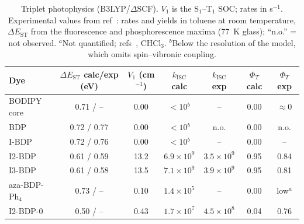 \documentclass[journal=jctcce,manuscript=article]{achemso}
\newcommand{\kisc}{k_\mathrm{ISC}}
\begin{document}
\begin{table}
  \caption{Triplet photophysics (B3LYP/$\Delta$SCF). $V_1$ is the S$_1$--T$_1$ SOC; rates in s$^{-1}$.
  Experimental values from ref~: rates and yields in toluene at room temperature,
  $\Delta E_\mathrm{ST}$ from the fluorescence and phosphorescence maxima (77~K glass); ``n.o.'' = not observed.
  $^a$Not quantified; refs~, CHCl$_3$. $^b$Below the resolution of the model, which
  omits spin--vibronic coupling.}
  \label{tab:isc}
  \small
  \begin{tabular}{lcccccc}
    \toprule
    Dye & $\Delta E_\mathrm{ST}$ calc/exp (eV) & $V_1$ (cm$^{-1}$) & $\kisc$ calc & $\kisc$ exp &
    $\Phi_T$ calc & $\Phi_T$ exp \\
    \midrule
    BODIPY core    & 0.71 / --    & 0.00 & $<10$$^b$ & --  & 0.00 & $\approx0$ \\
    BDP            & 0.72 / 0.77  & 0.00 & $<10$$^b$ & n.o. & 0.00 & n.o. \\
    I-BDP          & 0.72 / 0.76  & 0.00 & $<10$$^b$ & -- & 0.00 & -- \\
    I2-BDP         & 0.61 / 0.59  & 13.2 & $6.9\times10^{9}$ & $3.5\times10^{9}$ & 0.95 & 0.84 \\
    I3-BDP         & 0.61 / 0.58  & 13.5 & $7.1\times10^{9}$ & $3.9\times10^{9}$ & 0.95 & 0.81 \\
    aza-BDP-Ph$_4$ & 0.73 / --    & 0.10 & $1.4\times10^{5}$ & -- & 0.00 & low$^a$ \\
    \midrule
    I2-BDP-0       & 0.50 / --    & 0.43 & $1.7\times10^{7}$ & $4.5\times10^{8}$ & 0.04 & 0.76 \\
    \bottomrule
  \end{tabular}
\end{table}
\end{document}
